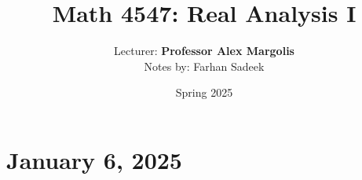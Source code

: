 \documentclass[11pt]{article} \usepackage{lindrew}
\title{Math 4547: Real Analysis I} \author{Lecturer: \textbf{Professor Alex Margolis}\\Notes by: Farhan Sadeek} \date{Spring 2025}
\begin{document}
\maketitle
\section{January 6, 2025}
\begin{theorem}

\end{theorem}
\begin{lemma}

\end{lemma}

\begin{proposition}

\end{proposition}
\begin{corollary}

\end{corollary}
\begin{conjecture}

\end{conjecture}

\begin{definition}

\end{definition}

\begin{example}

\end{example}

\begin{fact}

\end{fact}
\begin{problem}
\end{problem}

\begin{question}
\end{question}

\begin{claim}

\end{claim}
\end{document}
